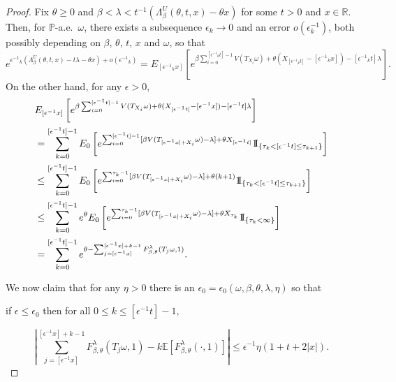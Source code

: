 \documentclass[a4paper]{amsart}
\numberwithin{equation}{section}
\theoremstyle{plain}
\theoremstyle{remark}
\begin{document}
\begin{proof}
  {}{Fix} $\theta\ge0$ and 
  $\beta < \lambda < t^{-1}\left(\Lambda_\beta^U(\theta,t,x) - 
  \theta x\right)$ for some $t>0$ and $x\in\mathbb{R}$. 
  {}{Then, for $\mathbb{P}$-a.e.\ $\omega$, there exists 
  a subsequence $\epsilon_k\to 0$ and an error $o(\epsilon_k^{-1})$,
  both possibly depending on
$\beta$, $\theta$, $t$, $x$ and $\omega$, so that}
\begin{equation}
  \label{eq-cancun1}
	{}{
	  e^{{\epsilon^{-1}}_k(\Lambda_\beta^U(\theta,t,x) - 
	  t\lambda - \theta x) + o({\epsilon^{-1}}_k)} = 
	  E_{[{\epsilon^{-1}}_k x]}\left[e^{\beta\sum_{i=0}^{[{\epsilon^{-1}}_k t]-1}V(T_{X_i}\omega) + \theta (X_{[{\epsilon^{-1}}_k t]} - [{\epsilon^{-1}}_k x]) - [{\epsilon^{-1}}_k t]\lambda}\right].
	}
	\end{equation}
	{}{On the other hand, for any ${\epsilon}>0$,}
	\begin{align}
	  \label{eq-cancun2}
	
	  &E_{[{\epsilon^{-1}} x]}\left[e^{\beta\sum_{i=0}^{[{\epsilon^{-1}} t]-1}V(T_{X_i}\omega) + \theta (X_{[{\epsilon^{-1}} t]} - [{\epsilon^{-1}} x]) - [{\epsilon^{-1}} t]\lambda}\right]\nonumber\\
	&= \sum_{k=0}^{[{\epsilon^{-1}} t]-1}E_0\left[e^{\sum_{i=0}^{[{\epsilon^{-1}} t]-1}[\beta V(T_{[{\epsilon^{-1}} x] + X_i}\omega) - \lambda] + \theta X_{[{\epsilon^{-1}} t]}}{{{\rm 1\mkern-1.5mu}\!{\rm I}}}_{\{\tau_{k} < [{\epsilon^{-1}} t] \le \tau_{k + 1}\}}\right]\nonumber\\
	&\le \sum_{k=0}^{[{\epsilon^{-1}} t]-1}E_0\left[e^{\sum_{i=0}^{\tau_k-1}[\beta V(T_{[{\epsilon^{-1}} x] + X_i}\omega) - \lambda] + \theta(k+1)}{{{\rm 1\mkern-1.5mu}\!{\rm I}}}_{\{\tau_{k} < [{\epsilon^{-1}} t] \le \tau_{k + 1}\}}\right]\nonumber\\
	&\le \sum_{k=0}^{[{\epsilon^{-1}} t]-1}e^{\theta}E_0\left[e^{\sum_{i=0}^{\tau_k-1}[\beta V(T_{[{\epsilon^{-1}} x] + X_i}\omega) - \lambda] + \theta X_{\tau_{k}}}{{{\rm 1\mkern-1.5mu}\!{\rm I}}}_{\{\tau_{k} <\infty\}}\right]\nonumber\\
	&= \sum_{k=0}^{[{\epsilon^{-1}} t]-1}e^{\theta - \sum_{j=[{\epsilon^{-1}} x]}^{[{\epsilon^{-1}} x]+k-1}F_{\beta,\theta}^\lambda(T_j\omega,1)} .
	
	\end{align}
	{}{We now claim that for any $\eta>0$ there is
	  an $\epsilon_0=\epsilon_0(\omega,\beta,\theta,\lambda,\eta)$ so that
	  
	if ${\epsilon}\le{\epsilon}_0$ then for all $0\leq k\leq [{\epsilon^{-1}} t]-1$,}
	\begin{equation}
	  \label{eq-cancun3}
	{}{\left|\sum_{j=[{\epsilon^{-1}} x]}^{[{\epsilon^{-1}} x]+k-1}F_{\beta,\theta}^\lambda(T_j\omega,1) - k\mathbb{E}[F_{\beta,\theta}^\lambda(\cdot,1)]\right|\le {\epsilon^{-1}}\eta 
      (1+t + 2|x|).}
      \end{equation}
	

\end{proof}
\end{document}
